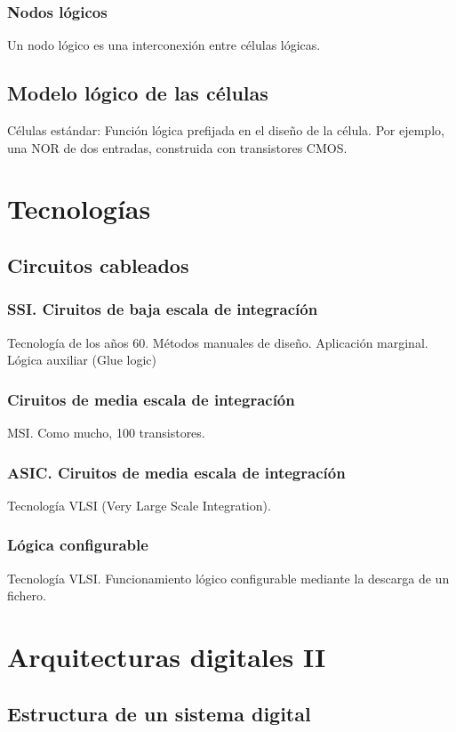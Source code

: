 \documentclass[a4paper]{book}
\begin{document}
\subsubsection{Nodos lógicos}
Un nodo lógico es una interconexión entre células lógicas.

\subsection{Modelo lógico de las células}
Células estándar: Función lógica prefijada en el diseño de la célula. Por ejemplo, una NOR de dos entradas, construida con transistores CMOS.


\section{Tecnologías}
\subsection{Circuitos cableados}
\subsubsection{SSI. Ciruitos de baja escala de integracíón}
Tecnología de los años 60. Métodos manuales de diseño. Aplicación marginal. Lógica auxiliar (Glue logic)
\subsubsection{Ciruitos de media escala de integracíón}
MSI. 
Como mucho, 100 transistores.
\subsubsection{ASIC. Ciruitos de media escala de integracíón}
Tecnología VLSI (Very Large Scale Integration).

\subsubsection{Lógica configurable}
Tecnología VLSI.
Funcionamiento lógico configurable mediante la descarga de un fichero.
\section{Arquitecturas digitales II}

\subsection{Estructura de un sistema digital}
\end{document}
